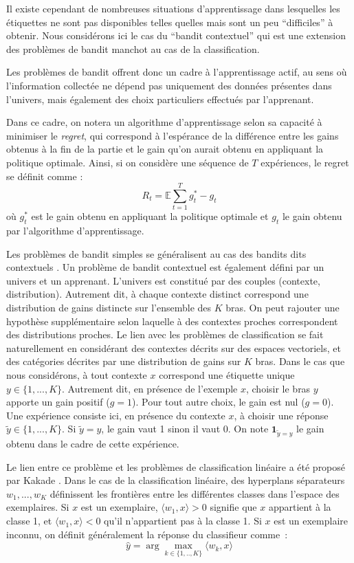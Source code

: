 \documentclass[preprint,12pt,authoryear]{elsarticle}
\begin{document}
Il existe cependant de nombreuses situations d'apprentissage dans lesquelles les étiquettes ne sont pas disponibles telles quelles mais sont un peu ``difficiles'' à obtenir. Nous considérons ici le cas du ``bandit contextuel'' qui est une extension des problèmes de bandit manchot au cas de la classification. 



Les problèmes de bandit offrent donc un cadre à l'apprentissage actif, au sens où l'information collectée ne dépend pas uniquement des données présentes dans l'univers, mais également des choix particuliers effectués par l'apprenant. 

Dans ce cadre, on notera un algorithme d'apprentissage selon sa capacité à minimiser le \textit{regret}, qui correspond à l'espérance de la différence entre les gains obtenus à la fin de la partie et le gain qu'on aurait obtenu en appliquant la politique optimale. 
Ainsi, si on considère une séquence de $T$ expériences, le regret se définit comme :
$$R_t = \mathbb{E} \sum_{t=1}^T g_t^* - g_t$$
où $g_t^*$ est le gain obtenu en appliquant la politique optimale et $g_t$ le gain obtenu par l'algorithme d'apprentissage.

Les problèmes de bandit simples se généralisent au cas des bandits dits contextuels \cite{langford2008epoch}. Un problème de bandit contextuel est également défini par un univers et un apprenant. L'univers est constitué par des couples (contexte, distribution). Autrement dit, à chaque contexte distinct correspond une distribution de gains distincte sur l'ensemble des $K$ bras. On peut rajouter une hypothèse supplémentaire selon laquelle à des contextes proches correspondent des distributions proches. Le lien avec les problèmes de classification se fait naturellement en considérant des contextes décrits sur des espaces vectoriels, et des catégories décrites par une distribution de gains sur $K$ bras. Dans le cas que nous considérons, à tout contexte $x$ correspond une étiquette unique $y \in \{1,...,K\}$. Autrement dit, en présence de l'exemple $x$, choisir le bras $y$ apporte un gain positif ($g=1$). Pour tout autre choix, le gain est nul ($g=0$). Une expérience consiste ici, en présence du contexte $x$, à choisir une réponse $\tilde{y} \in \{1,...,K\}$. Si $\tilde{y} = y$, le gain vaut 1 sinon il vaut 0. On note $\mathbf{1}_{\tilde{y} = y}$ le gain obtenu dans le cadre de cette expérience. 

Le lien entre ce problème et les problèmes de classification linéaire a été proposé par Kakade \cite{kakade2008efficient}. Dans le cas de la classification linéaire, des hyperplans séparateurs $w_1, ..., w_K$ définissent les frontières entre les différentes classes dans l'espace des exemplaires.  
Si $x$ est un exemplaire, $\langle w_1, x \rangle > 0$ signifie que $x$ appartient à la classe 1, et $\langle w_1, x \rangle < 0$ qu'il n'appartient pas à la classe 1. Si $x$ est un exemplaire inconnu, on définit généralement la réponse du classifieur comme~:
$$\hat{y} = \arg \max_{k \in\{1,..,K\}}  \langle w_k, x \rangle$$
\end{document}
